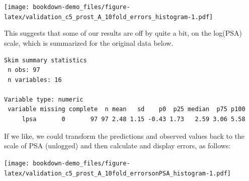 \documentclass[]{book}
\newenvironment{Shaded}{\begin{snugshade}}{\end{snugshade}}
\newcommand{\KeywordTok}[1]{\textcolor[rgb]{0.13,0.29,0.53}{\textbf{#1}}}
\newcommand{\DataTypeTok}[1]{\textcolor[rgb]{0.13,0.29,0.53}{#1}}
\newcommand{\DecValTok}[1]{\textcolor[rgb]{0.00,0.00,0.81}{#1}}
\newcommand{\StringTok}[1]{\textcolor[rgb]{0.31,0.60,0.02}{#1}}
\newcommand{\OperatorTok}[1]{\textcolor[rgb]{0.81,0.36,0.00}{\textbf{#1}}}
\newcommand{\NormalTok}[1]{#1}
\theoremstyle{definition}
\theoremstyle{definition}
\theoremstyle{definition}
\theoremstyle{remark}
\begin{document}
\texttt{[image: bookdown-demo\_files/figure-latex/validation\_c5\_prost\_A\_10fold\_errors\_histogram-1.pdf]}

This suggests that some of our results are off by quite a bit, on the
log(PSA) scale, which is summarized for the original data below.

\begin{Shaded}
\end{Shaded}

\begin{verbatim}
Skim summary statistics
 n obs: 97 
 n variables: 16 

Variable type: numeric 
 variable missing complete  n mean   sd    p0  p25 median  p75 p100
     lpsa       0       97 97 2.48 1.15 -0.43 1.73   2.59 3.06 5.58
\end{verbatim}

If we like, we could transform the predictions and observed values back
to the scale of PSA (unlogged) and then calculate and display errors, as
follows:

\begin{Shaded}
\end{Shaded}

\texttt{[image: bookdown-demo\_files/figure-latex/validation\_c5\_prost\_A\_10fold\_errorsonPSA\_histogram-1.pdf]}
\end{document}
